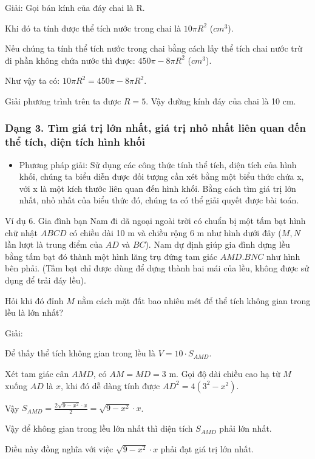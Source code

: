 \documentclass[%
    fontsize=12pt,%
    chapterprefix=false,%
    open=right,%
    twoside=false,%
    numbers=noenddot,%
    headings=optiontohead,%
    final,%
    DIV=15,%
    parskip=half %
]{scrbook}
\begin{document}

Giải: Gọi bán kính của đáy chai là R.

Khi đó ta tính được thể tích nước trong chai là $10\pi R^2$ ($cm^3$).

Nếu chúng ta tính thể tích nước trong chai bằng cách lấy thể tích chai nước trừ đi phần không chứa nước thì được: $450\pi - 8\pi R^2$ ($cm^3$).

Như vậy ta có: $10\pi R^2 = 450\pi - 8\pi R^2$.

Giải phương trình trên ta được $R = 5$. Vậy đường kính đáy của chai là 10 cm.
\subsubsection{Dạng 3. Tìm giá trị lớn nhất, giá trị nhỏ nhất liên quan đến thể tích, diện tích hình khối}

\begin{itemize}
  \item Phương pháp giải: Sử dụng các công thức tính thể tích, diện tích của hình khối, chúng ta biểu diễn được đối tượng cần xét bằng một biểu thức chứa x, với x là một kích thước liên quan đến hình khối. Bằng cách tìm giá trị lớn nhất, nhỏ nhất của biểu thức đó, chúng ta có thể giải quyết được bài toán.
\end{itemize}

Ví dụ 6. Gia đình bạn Nam đi dã ngoại ngoài trời có chuẩn bị một tấm bạt hình chữ nhật $ABCD$ có chiều dài 10 m và chiều rộng 6 m như hình dưới đây ($M, N$ lần lượt là trung điểm của $AD$ và $BC$). Nam dự định giúp gia đình dựng lều bằng tấm bạt đó thành một hình lăng trụ đứng tam giác $AMD.BNC$ như hình bên phải. (Tấm bạt chỉ được dùng để dựng thành hai mái của lều, không được sử dụng để trải đáy lều).

Hỏi khi đó đỉnh $M$ nằm cách mặt đất bao nhiêu mét để thể tích không gian trong lều là lớn nhất?

Giải:

Để thấy thể tích không gian trong lều là $V = 10 \cdot S_{AMD}$.

Xét tam giác cân $AMD$, có $AM = MD = 3$ m. Gọi độ dài chiều cao hạ từ $M$ xuống $AD$ là $x$, khi đó dễ dàng tính được $AD^2 = 4(3^2 - x^2)$.

Vậy $S_{AMD} = \frac{2\sqrt{9-x^2} \cdot x}{2} = \sqrt{9-x^2} \cdot x$.

Vậy để không gian trong lều lớn nhất thì diện tích $S_{AMD}$ phải lớn nhất.

Điều này đồng nghĩa với việc $\sqrt{9-x^2} \cdot x$ phải đạt giá trị lớn nhất.
\end{document}
